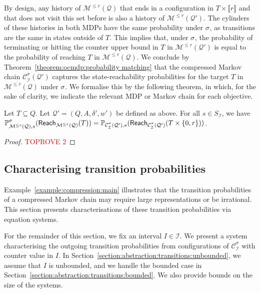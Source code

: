 \documentclass[a4paper,UKenglish,cleveref,autoref,thm-restate,colorlinks]{lipics-v2021}
\newcommand{\integerInterval}[1]{\llbracket{}#1\rrbracket{}}
\newcommand{\mdp}{\mathcal{M}}
\newcommand{\mdpStateSpace}{S}
\newcommand{\weight}{w}
\newcommand{\ocmdp}{\mathcal{Q}}
\newcommand{\ocmdpFin}[2]{\mdp^{\leq #2}(#1)}
\newcommand{\ocStateSpace}{Q}
\newcommand{\ocConfig}{s}
\newcommand{\ocActionSpace}{A}
\newcommand{\ocTrans}{\delta}
\newcommand{\counterUB}{r}
\newcommand{\mchain}{\mathcal{C}}
\newcommand{\intPart}{\mathcal{I}}
\newcommand{\interval}{I}
\newcommand{\compressChainStrat}[1]{\mchain^{#1}_{\intPart}}
\newcommand{\compressChain}{\compressChainStrat{\strat}}
\newcommand{\compressChainB}{\mchain^{\strat}_{\intPart}({\ocmdp'})}
\newcommand{\compressChainStateSpace}{\mdpStateSpace_{\intPart}}
\newcommand{\reachVerb}[2]{\mathsf{Reach}_{#1}(#2)}
\newcommand{\target}{T}
\newcommand{\stratGeneric}[1]{{\sigma_{#1}}}
\newcommand{\strat}{\stratGeneric{}}
\begin{document}
By design, any history of $\ocmdpFin{\ocmdp}{\counterUB}$ that ends in a configuration in $\target\times\integerInterval{\counterUB}$ and that does not visit this set before is also a history of $\ocmdpFin{\ocmdp'}{\counterUB}$.
The cylinders of these histories in both MDPs have the same probability under $\strat$, as transitions are the same in states outside of $\target$.
This implies that, under $\strat$, the probability of terminating or hitting the counter upper bound in $\target$ in $\ocmdpFin{\ocmdp'}{\counterUB}$ is equal to the probability of reaching $\target$ in $\ocmdpFin{\ocmdp}{\counterUB}$.
We conclude by Theorem~\ref{theorem:ocmdp:probability matching} that the compressed Markov chain $\compressChainB$ captures the state-reachability probabilities for the target $\target$ in $\ocmdpFin{\ocmdp}{\counterUB}$ under $\strat$.
We formalise this by the following theorem, in which, for the sake of clarity, we indicate the relevant MDP or Markov chain for each objective.

\begin{theorem}\label{theorem:ocmdp:probability:reach}
    Let $\target\subseteq\ocStateSpace$.
  Let $\ocmdp' = (\ocStateSpace, \ocActionSpace, \ocTrans', \weight')$ be defined as above. For all $\ocConfig\in\compressChainStateSpace$, we have
  $\probaGverb{\ocmdpFin{\ocmdp}{\counterUB}}{\ocConfig}{\strat}(\reachVerb{\ocmdpFin{\ocmdp}{\counterUB}}{\target}) =
  \probaMCverb{\compressChainB}{\ocConfig}(\reachVerb{\compressChainB}{\target\times\{0, \counterUB\}})$.
\end{theorem}
\begin{proof}\textcolor{red}{TOPROVE 2}\end{proof}
\subsection{Characterising transition probabilities}\label{section:abstraction:transitions}

Example~\ref{example:compression:main} illustrates that the transition probabilities of a compressed Markov chain may require large representations or be irrational.
This section presents characterisations of these transition probabilities via equation systems.

For the remainder of this section, we fix an interval $\interval\in\intPart$.
We present a system characterising the outgoing transition probabilities from configurations of $\compressChain$ with counter value in $\interval$.
In Section~\ref{section:abstraction:transitions:unbounded}, we assume that $\interval$ is unbounded, and we handle the bounded case in Section~\ref{section:abstraction:transitions:bounded}.
We also provide bounds on the size of the systems.
\end{document}
